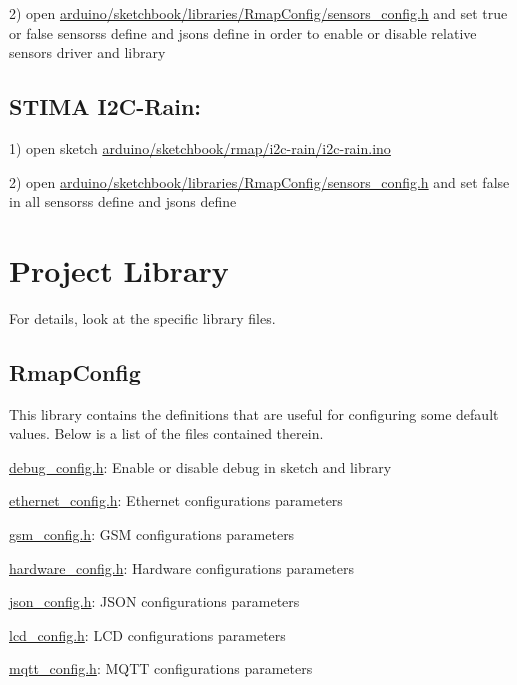 2) open \hyperlink{sensors__config_8h}{arduino/sketchbook/libraries/\+Rmap\+Config/sensors\+\_\+config.\+h} and set true or false sensors\textquotesingle{}s define and json\textquotesingle{}s define in order to enable or disable relative sensor\textquotesingle{}s driver and library\hypertarget{index_i2c-rain}{}\subsection{S\+T\+I\+M\+A I2\+C-\/\+Rain\+:}\label{index_i2c-rain}
1) open sketch \hyperlink{i2c-rain_8ino}{arduino/sketchbook/rmap/i2c-\/rain/i2c-\/rain.\+ino}

2) open \hyperlink{sensors__config_8h}{arduino/sketchbook/libraries/\+Rmap\+Config/sensors\+\_\+config.\+h} and set false in all sensors\textquotesingle{}s define and json\textquotesingle{}s define\hypertarget{index_library}{}\section{Project Library}\label{index_library}
For details, look at the specific library files.\hypertarget{index_rmapconfig}{}\subsection{Rmap\+Config}\label{index_rmapconfig}
This library contains the definitions that are useful for configuring some default values. Below is a list of the files contained therein.

\hyperlink{debug__config_8h}{debug\+\_\+config.\+h}\+: Enable or disable debug in sketch and library

\hyperlink{ethernet__config_8h}{ethernet\+\_\+config.\+h}\+: Ethernet configuration\textquotesingle{}s parameters

\hyperlink{gsm__config_8h}{gsm\+\_\+config.\+h}\+: G\+SM configuration\textquotesingle{}s parameters

\hyperlink{hardware__config_8h}{hardware\+\_\+config.\+h}\+: Hardware configuration\textquotesingle{}s parameters

\hyperlink{json__config_8h}{json\+\_\+config.\+h}\+: J\+S\+ON configuration\textquotesingle{}s parameters

\hyperlink{lcd__config_8h}{lcd\+\_\+config.\+h}\+: L\+CD configuration\textquotesingle{}s parameters

\hyperlink{mqtt__config_8h}{mqtt\+\_\+config.\+h}\+: M\+Q\+TT configuration\textquotesingle{}s parameters

